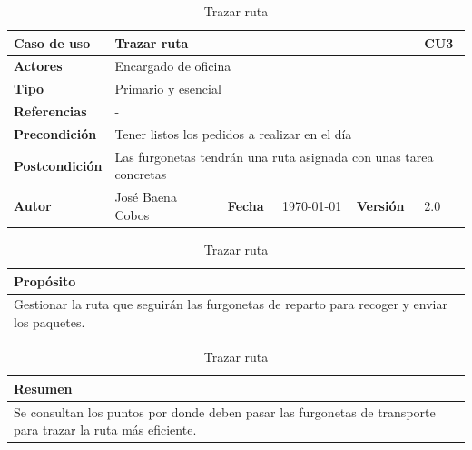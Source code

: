 \documentclass[12pt,spanish]{article}
\begin{document}
\begin{table}[H]
\centering
\begin{tabular}{|m{3cm}|m{4cm}|m{2cm}|m{2cm}|m{2cm}|m{1cm}|}
\hline
\textbf{Caso de uso} &  \multicolumn{4}{m{8cm}|}{Trazar ruta} \vline &  \cellcolor{gray!40}CU3 \\
\hline
\textbf{Actores} & \multicolumn{5}{m{8cm}|}{Encargado de oficina} \\
\hline
\textbf{Tipo} & \multicolumn{5}{m{8cm}|}{Primario y esencial} \\
\hline
\textbf{Referencias} &\multicolumn{5}{m{8cm}|}{-} \\
\hline
\textbf{Precondición} & \multicolumn{5}{m{8cm}|}{Tener listos los pedidos a realizar en el día} \\
\hline
\textbf{Postcondición} & \multicolumn{5}{m{8cm}|}{Las furgonetas tendrán una ruta asignada con unas tarea concretas} \\
\hline
\textbf{Autor} & José Baena Cobos & \textbf{Fecha} & \today & \textbf{Versión} & 2.0 \\
\hline
\end{tabular}

\vspace{1cm}

\begin{tabular}{|m{16.2cm}|}
\hline
\textbf{Propósito} \\
\hline
Gestionar la ruta que seguirán las furgonetas de reparto para recoger y enviar los paquetes. \\
\hline
\end{tabular}

\vspace{1cm}

\begin{tabular}{|m{16.2cm}|}
\hline
\textbf{Resumen} \\
\hline
Se consultan los puntos por donde deben pasar las furgonetas de transporte para trazar la ruta más eficiente. \\
\hline
\end{tabular}

\caption{Trazar ruta}
\label{cu:3}
\end{table}


\end{document}
